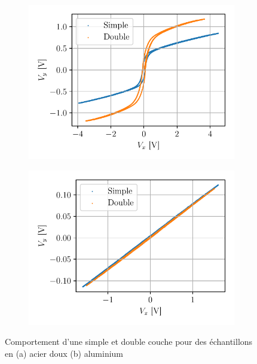 \begin{figure}[h]
    \centering
    \begin{subfigure}{0.5\linewidth}
        \centering
        \includegraphics[width=\linewidth]{figures/ac_doux_simple_vs_combo.pdf}
        \caption{}
        \label{fig:acier_combo}
    \end{subfigure}%
    \begin{subfigure}{0.5\linewidth}
        \centering
        \includegraphics[width=\linewidth]{figures/alu_simple_vs_combo.pdf}
        \caption{}
        \label{fig:alu_combo}
    \end{subfigure}
    \caption{Comportement d'une simple et double couche pour des échantillons en (a) acier doux (b) aluminium}
    \label{fig:combo}
\end{figure}

